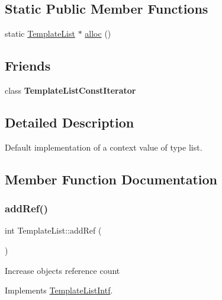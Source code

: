 \subsection*{Static Public Member Functions}
\begin{DoxyCompactItemize}
\item 
static \mbox{\hyperlink{class_template_list}{Template\+List}} $\ast$ \mbox{\hyperlink{class_template_list_ada6751243c72ffd2c4a4a9aa0d752ef3}{alloc}} ()
\end{DoxyCompactItemize}
\subsection*{Friends}
\begin{DoxyCompactItemize}
\item 
\mbox{\label{class_template_list_a5f57a87e481b901242e6e7e90bc03e2b}} 
class {\bfseries Template\+List\+Const\+Iterator}
\end{DoxyCompactItemize}


\subsection{Detailed Description}
Default implementation of a context value of type list. 

\subsection{Member Function Documentation}
\mbox{\label{class_template_list_a144bf4bdc326ba570eba62b1dc90f32f}} 
\subsubsection{\texorpdfstring{addRef()}{addRef()}}
{\footnotesize\ttfamily int Template\+List\+::add\+Ref (\begin{DoxyParamCaption}{ }\end{DoxyParamCaption})\hspace{0.3cm}{\ttfamily [virtual]}}

Increase object\textquotesingle{}s reference count 

Implements \mbox{\hyperlink{class_template_list_intf_a4b4973e2e15396d10bc4e3085462ca2b}{Template\+List\+Intf}}.

